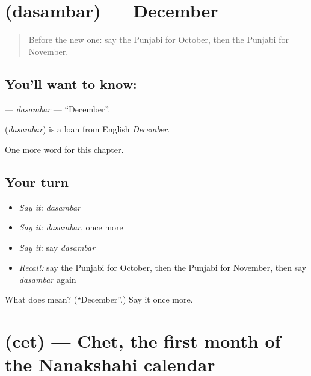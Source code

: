 \section[\texorpdfstring{\pa{ਦਸੰਬਰ} (dasambar)}{ਦਸੰਬਰ (dasambar)}]{ (dasambar) — December}

\label{lesson:PA-C103-dasambar}



\begin{quote}
Before the new one: say the Punjabi for October, then the Punjabi for November.
\end{quote}

\subsection*{You'll want to know: }
\textbf{} — \emph{dasambar} — \textquotedblleft{}December\textquotedblright{}.

\begin{cousinweb}
\textbf{} (\emph{dasambar}) is a loan from English \emph{December}.
\end{cousinweb}

\begin{grammarlens}[title={What you've built}]
One more word for this chapter.
\end{grammarlens}

\subsection*{Your turn}
\begin{itemize}
\raggedright
  \item \emph{Say it:} \emph{dasambar}
  \item \emph{Say it:} \emph{dasambar}, once more
  \item \emph{Say it:} say \emph{dasambar}
  \item \emph{Recall:} say the Punjabi for October, then the Punjabi for November, then say \emph{dasambar} again
\end{itemize}

\begin{tcolorbox}[breakable,colback=teal!4,colframe=teal!35!black,title={Before you move on}]
What does  mean? (\textquotedblleft{}December\textquotedblright{}.) Say it once more.
\end{tcolorbox}
\section[\texorpdfstring{\pa{ਚੇਤ} (cet)}{ਚੇਤ (cet)}]{ (cet) — Chet, the first month of the Nanakshahi calendar}


